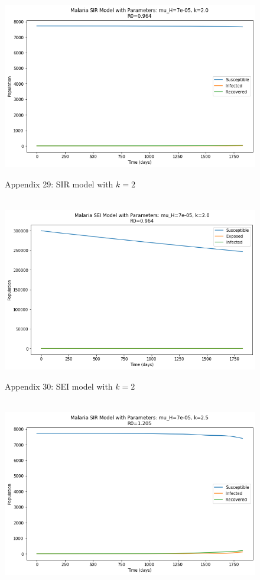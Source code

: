 \documentclass[
	12pt,				%
	oneside,			%
	a4paper,			%
	english,			%
	brazil				%
	]{abntex2}
\begin{document}
\begin{apendicesenv}
\begin{figure}[!ht]
	\hbox{\hspace{3.0em} \includegraphics[scale=0.6] {THESIS-SIR_k_2.png}}
	\caption*{Appendix 29: SIR model with $k=2$}
\end{figure} 
\begin{figure}[!ht]
	\centering
	\hbox{\hspace{3.0em} \includegraphics[scale=0.6] {THESIS-SEI_k_2.png}}
	\caption*{Appendix 30: SEI model with $k=2$}
\end{figure}
\newpage
\begin{figure}[!ht]
	\centering
	\hbox{\hspace{3.0em} \includegraphics[scale=0.6] {THESIS-SIR_k_2_5.png}}

\end{figure}
\end{apendicesenv}
\end{document}
